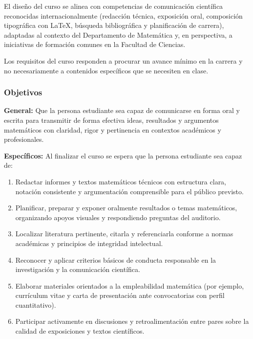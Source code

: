 \begin{refsection}
El diseño del curso se alinea con competencias de comunicación científica reconocidas internacionalmente (redacción técnica, exposición oral, composición tipográfica con \LaTeX{}, búsqueda bibliográfica y planificación de carrera), adaptadas al contexto del Departamento de Matemática y, en perspectiva, a iniciativas de formación comunes en la Facultad de Ciencias.

Los requisitos del curso responden a procurar un avance mínimo en la carrera y no necesariamente a contenidos específicos que se necesiten en clase.

\subsubsection*{Objetivos}

\textbf{General:} Que la persona estudiante sea capaz de comunicarse en forma oral y escrita para transmitir de forma efectiva ideas, resultados y argumentos matemáticos con claridad, rigor y pertinencia en contextos académicos y profesionales.

\textbf{Específicos:} Al finalizar el curso se espera que la persona estudiante sea capaz de:

\begin{enumerate}
\item Redactar informes y textos matemáticos técnicos con estructura clara, notación consistente y argumentación comprensible para el público previsto.
\item Planificar, preparar y exponer oralmente resultados o temas matemáticos, organizando apoyos visuales y respondiendo preguntas del auditorio.
\item Localizar literatura pertinente, citarla y referenciarla conforme a normas académicas y principios de integridad intelectual.
\item Reconocer y aplicar criterios básicos de conducta responsable en la investigación y la comunicación científica.
\item Elaborar materiales orientados a la empleabilidad matemática (por ejemplo, currículum vitae y carta de presentación ante convocatorias con perfil cuantitativo).
\item Participar activamente en discusiones y retroalimentación entre pares sobre la calidad de exposiciones y textos científicos.
\end{enumerate}


\end{refsection}
